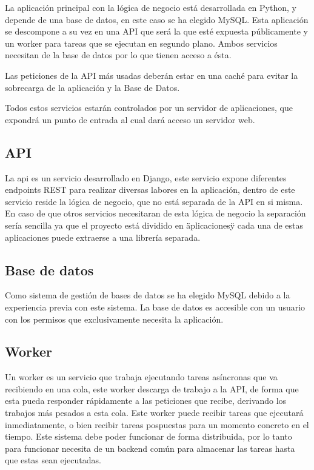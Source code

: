 \documentclass[12pt,a4paperpaper,]{report}
\begin{document}
La aplicación principal con la lógica de negocio está desarrollada en
Python, y depende de una base de datos, en este caso se ha elegido
MySQL. Esta aplicación se descompone a su vez en una API que será la que
esté expuesta públicamente y un worker para tareas que se ejecutan en
segundo plano. Ambos servicios necesitan de la base de datos por lo que
tienen acceso a ésta.

Las peticiones de la API más usadas deberán estar en una caché para
evitar la sobrecarga de la aplicación y la Base de Datos.

Todos estos servicios estarán controlados por un servidor de
aplicaciones, que expondrá un punto de entrada al cual dará acceso un
servidor web.

\subsection{API}\label{api}

La api es un servicio desarrollado en Django, este servicio expone
diferentes endpoints REST para realizar diversas labores en la
aplicación, dentro de este servicio reside la lógica de negocio, que no
está separada de la API en si misma. En caso de que otros servicios
necesitaran de esta lógica de negocio la separación sería sencilla ya
que el proyecto está dividido en äplicacionesÿ cada una de estas
aplicaciones puede extraerse a una librería separada.

\subsection{Base de datos}\label{base-de-datos-1}

Como sistema de gestión de bases de datos se ha elegido MySQL debido a
la experiencia previa con este sistema. La base de datos es accesible
con un usuario con los permisos que exclusivamente necesita la
aplicación.

\subsection{Worker}\label{worker}

Un worker es un servicio que trabaja ejecutando tareas asíncronas que va
recibiendo en una cola, este worker descarga de trabajo a la API, de
forma que esta pueda responder rápidamente a las peticiones que recibe,
derivando los trabajos más pesados a esta cola. Este worker puede
recibir tareas que ejecutará inmediatamente, o bien recibir tareas
pospuestas para un momento concreto en el tiempo. Este sistema debe
poder funcionar de forma distribuida, por lo tanto para funcionar
necesita de un backend común para almacenar las tareas hasta que estas
sean ejecutadas.
\end{document}
